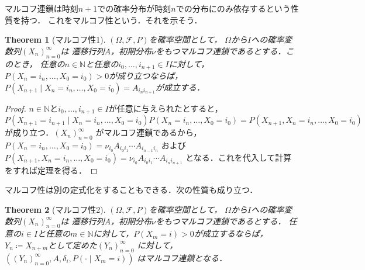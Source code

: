 \documentclass[dvipdfmx,autodetect-engine]{jsarticle}
\newtheorem{theorem}{Theorem}[section]
\theoremstyle{remark}
\theoremstyle{definition}
\newcommand{\N}{\mathbb{N}}
\begin{document}
マルコフ連鎖は時刻$n+1$での確率分布が時刻$n$での分布にのみ依存するという性質を持つ．
これをマルコフ性という．それを示そう．

\begin{theorem}[マルコフ性1]
    $(\Omega,\mathcal{F},P)$を確率空間として，
    $\Omega$から$I$への確率変数列$(X_n)_{n=0}^{\infty}$は
    遷移行列$A$，初期分布$\nu$をもつマルコフ連鎖であるとする．このとき，
    任意の$n \in \N$と任意の$i_0,\ldots,i_{n+1} \in I$に対して，
    $P(X_n = i_n,\ldots,X_0 = i_0) >0$が成り立つならば，
    $P(X_{n+1} \mid X_n = i_n,\ldots,X_0 = i_0)=A_{i_n i_{n+1}}$が成立する．
\end{theorem}

\begin{proof}
    $n \in \N$と$i_0,\ldots,i_{n+1} \in I$が任意に与えられたとすると，
    $P(X_{n+1}=i_{n+1} \mid X_n = i_n,\ldots,X_0 = i_0)P(X_n = i_n,\ldots,X_0 = i_0) 
    = P(X_{n+1},X_n = i_n,\ldots,X_0 = i_0)$が成り立つ．$(X_n)_{n=0}^{\infty}$
    がマルコフ連鎖であるから，$P(X_n = i_n,\ldots,X_0 = i_0) = \nu_{i_0} A_{i_0 i_1} \cdots A_{i_{n-1} i_n}$
    および$P(X_{n+1},X_n = i_n,\ldots,X_0 = i_0) = \nu_{i_0} A_{i_0 i_1} \cdots A_{i_{n} i_{n+1}}$
    となる．これを代入して計算をすれば定理を得る．
\end{proof}

マルコフ性は別の定式化をすることもできる．次の性質も成り立つ．
\begin{theorem}[マルコフ性2]
    $(\Omega,\mathcal{F},P)$を確率空間として，
    $\Omega$から$I$への確率変数列$(X_n)_{n=0}^{\infty}$は
    遷移行列$A$，初期分布$\nu$をもつマルコフ連鎖であるとする．
    任意の$i \in I$と任意の$m \in \N$に対して，$P(X_m = i) >0$が成立するならば，
    $Y_n \coloneqq X_{n+m}$として定めた$(Y_n)_{n=0}^{\infty}$
    に対して，$((Y_n)_{n=0}^{\infty},A,\delta_i, P(\cdot \mid X_m = i))$
    はマルコフ連鎖となる．
\end{theorem}
\end{document}

